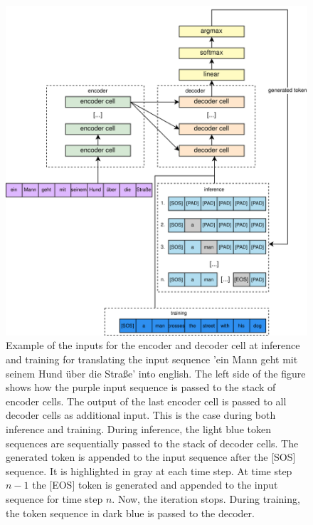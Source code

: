 \documentclass[a4paper]{scrartcl}
\begin{document}
    \begin{figure}[btp]
        \centering
        \includegraphics[width=\linewidth]{img/TransformerExample}
        \caption[Example inputs to the encoder and decoder cell]{
            Example of the inputs for the encoder and decoder cell at inference and training for translating the input sequence 'ein Mann geht mit seinem Hund über die Straße' into english.
            The left side of the figure shows how the purple input sequence is passed to the stack of encoder cells.
            The output of the last encoder cell is passed to all decoder cells as additional input.
            This is the case during both inference and training.
            During inference, the light blue token sequences are sequentially passed to the stack of decoder cells.
            The generated token is appended to the input sequence after the [SOS] sequence.
            It is highlighted in gray at each time step.
            At time step $n-1$ the [EOS] token is generated and appended to the input sequence for time step $n$.
            Now, the iteration stops.
            During training, the token sequence in dark blue is passed to the decoder.
        }
        \label{fig:transformer-example}
    \end{figure}
\end{document}

